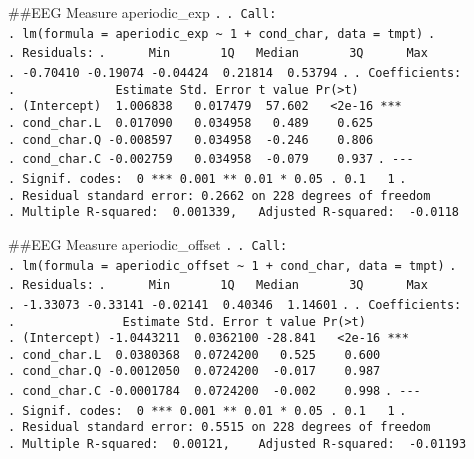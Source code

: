 \documentclass[
]{article}
\begin{document}
\#\#EEG Measure aperiodic\_exp \texttt{.} \texttt{.\ Call:}
\texttt{.\ lm(formula\ =\ aperiodic\_exp\ \textasciitilde{}\ 1\ +\ cond\_char,\ data\ =\ tmpt)}
\texttt{.} \texttt{.\ Residuals:}
\texttt{.\ \ \ \ \ \ Min\ \ \ \ \ \ \ 1Q\ \ \ Median\ \ \ \ \ \ \ 3Q\ \ \ \ \ \ Max}
\texttt{.\ -0.70410\ -0.19074\ -0.04424\ \ 0.21814\ \ 0.53794}
\texttt{.} \texttt{.\ Coefficients:}
\texttt{.\ \ \ \ \ \ \ \ \ \ \ \ \ \ Estimate\ Std.\ Error\ t\ value\ Pr(\textgreater{}\textbar{}t\textbar{})}
\texttt{.\ (Intercept)\ \ 1.006838\ \ \ 0.017479\ \ 57.602\ \ \ \textless{}2e-16\ ***}
\texttt{.\ cond\_char.L\ \ 0.017090\ \ \ 0.034958\ \ \ 0.489\ \ \ \ 0.625}
\texttt{.\ cond\_char.Q\ -0.008597\ \ \ 0.034958\ \ -0.246\ \ \ \ 0.806}
\texttt{.\ cond\_char.C\ -0.002759\ \ \ 0.034958\ \ -0.079\ \ \ \ 0.937}
\texttt{.\ -\/-\/-}
\texttt{.\ Signif.\ codes:\ \ 0\ \textquotesingle{}***\textquotesingle{}\ 0.001\ \textquotesingle{}**\textquotesingle{}\ 0.01\ \textquotesingle{}*\textquotesingle{}\ 0.05\ \textquotesingle{}.\textquotesingle{}\ 0.1\ \textquotesingle{}\ \textquotesingle{}\ 1}
\texttt{.}
\texttt{.\ Residual\ standard\ error:\ 0.2662\ on\ 228\ degrees\ of\ freedom}
\texttt{.\ Multiple\ R-squared:\ \ 0.001339,\ \ \ Adjusted\ R-squared:\ \ -0.0118}

\#\#EEG Measure aperiodic\_offset \texttt{.} \texttt{.\ Call:}
\texttt{.\ lm(formula\ =\ aperiodic\_offset\ \textasciitilde{}\ 1\ +\ cond\_char,\ data\ =\ tmpt)}
\texttt{.} \texttt{.\ Residuals:}
\texttt{.\ \ \ \ \ \ Min\ \ \ \ \ \ \ 1Q\ \ \ Median\ \ \ \ \ \ \ 3Q\ \ \ \ \ \ Max}
\texttt{.\ -1.33073\ -0.33141\ -0.02141\ \ 0.40346\ \ 1.14601}
\texttt{.} \texttt{.\ Coefficients:}
\texttt{.\ \ \ \ \ \ \ \ \ \ \ \ \ \ \ Estimate\ Std.\ Error\ t\ value\ Pr(\textgreater{}\textbar{}t\textbar{})}
\texttt{.\ (Intercept)\ -1.0443211\ \ 0.0362100\ -28.841\ \ \ \textless{}2e-16\ ***}
\texttt{.\ cond\_char.L\ \ 0.0380368\ \ 0.0724200\ \ \ 0.525\ \ \ \ 0.600}
\texttt{.\ cond\_char.Q\ -0.0012050\ \ 0.0724200\ \ -0.017\ \ \ \ 0.987}
\texttt{.\ cond\_char.C\ -0.0001784\ \ 0.0724200\ \ -0.002\ \ \ \ 0.998}
\texttt{.\ -\/-\/-}
\texttt{.\ Signif.\ codes:\ \ 0\ \textquotesingle{}***\textquotesingle{}\ 0.001\ \textquotesingle{}**\textquotesingle{}\ 0.01\ \textquotesingle{}*\textquotesingle{}\ 0.05\ \textquotesingle{}.\textquotesingle{}\ 0.1\ \textquotesingle{}\ \textquotesingle{}\ 1}
\texttt{.}
\texttt{.\ Residual\ standard\ error:\ 0.5515\ on\ 228\ degrees\ of\ freedom}
\texttt{.\ Multiple\ R-squared:\ \ 0.00121,\ \ \ \ Adjusted\ R-squared:\ \ -0.01193}
\end{document}
